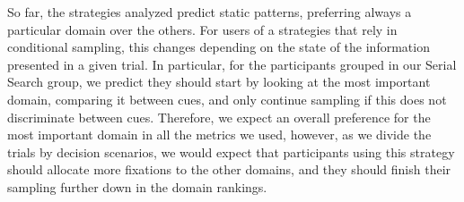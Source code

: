 \documentclass[
  english,
  man]{apa6}
\begin{document}
So far, the strategies analyzed predict static patterns, preferring always a particular domain over the others. For users of a strategies that rely in conditional sampling, this changes depending on the state of the information presented in a given trial. In particular, for the participants grouped in our Serial Search group, we predict they should start by looking at the most important domain, comparing it between cues, and only continue sampling if this does not discriminate between cues. Therefore, we expect an overall preference for the most important domain in all the metrics we used, however, as we divide the trials by decision scenarios, we would expect that participants using this strategy should allocate more fixations to the other domains, and they should finish their sampling further down in the domain rankings.
\end{document}
